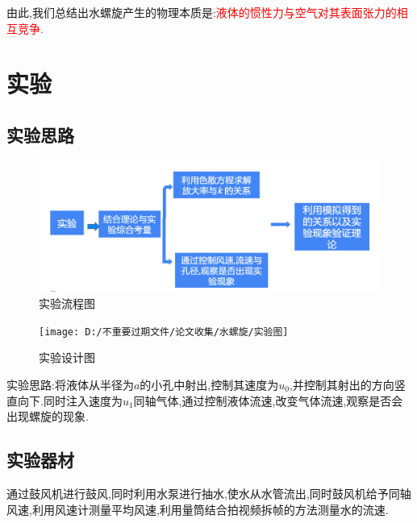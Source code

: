 \documentclass[UTF8]{gapd}
\begin{document}
由此,我们总结出水螺旋产生的物理本质是:\textcolor{red}{液体的惯性力与空气对其表面张力的相互竞争.}
\section{实验}
\label{sec:Experiment}
\subsection{实验思路}
\begin{figure}[h]%
	\centering
\includegraphics[width=1.2\columnwidth]{images/实验流程图}
	\caption{实验流程图}
	\label{fig:P2}%
\end{figure}
\begin{figure}[h]%
	\centering
	\texttt{[image: D:/不重要过期文件/论文收集/水螺旋/实验图]}
	\caption{实验设计图\cite{c3}}
	\label{fig:P2}%
\end{figure}

实验思路:将液体从半径为$a$的小孔中射出,控制其速度为$u_{0}$,并控制其射出的方向竖直向下.同时注入速度为$u_{1}$同轴气体,通过控制液体流速,改变气体流速,观察是否会出现螺旋的现象.
\subsection{实验器材}

通过鼓风机进行鼓风,同时利用水泵进行抽水,使水从水管流出,同时鼓风机给予同轴风速,利用风速计测量平均风速,利用量筒结合拍视频拆帧的方法测量水的流速.
\end{document}
